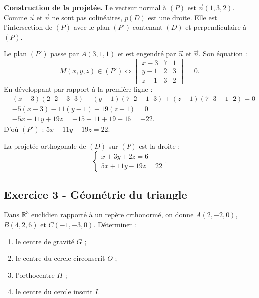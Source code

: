 \documentclass[12pt,a4paper]{article}
\begin{document}
\begin{boitecorrige}
\textbf{Construction de la projetée.}
Le vecteur normal à $(P)$ est $\vec{n}(1,3,2)$. Comme $\vec{u}$ et $\vec{n}$ ne sont pas colinéaires,
$p(D)$ est une droite. Elle est l'intersection de $(P)$ avec le plan $(P')$ contenant $(D)$ et
perpendiculaire à $(P)$.

Le plan $(P')$ passe par $A(3,1,1)$ et est engendré par $\vec{u}$ et $\vec{n}$. Son équation :
\[
  M(x,y,z)\in (P') \iff
  \begin{vmatrix} x-3 & 7 & 1 \\ y-1 & 2 & 3 \\ z-1 & 3 & 2 \end{vmatrix} = 0.
\]
En développant par rapport à la première ligne :
\begin{align*}
  &(x-3)(2\cdot2-3\cdot3) - (y-1)(7\cdot2-1\cdot3) + (z-1)(7\cdot3-1\cdot2) = 0\\
  &-5(x-3) - 11(y-1) + 19(z-1) = 0\\
  &-5x - 11y + 19z = -15 - 11 + 19 - 15 = -22.
\end{align*}
D'où $(P')$ : $5x + 11y - 19z = 22$.

La projetée orthogonale de $(D)$ sur $(P)$ est la droite :
\[
  \boxed{\begin{cases} x + 3y + 2z = 6 \\ 5x + 11y - 19z = 22 \end{cases}.}
\]
\end{boitecorrige}

\subsection*{Exercice 3 - Géométrie du triangle \niveau{\difficile}}

\begin{boiteexercice}
Dans $\mathbb{R}^3$ euclidien rapporté à un repère orthonormé, on donne $A(2,-2,0)$, $B(4,2,6)$ et
$C(-1,-3,0)$. Déterminer :
\begin{enumerate}
  \item le centre de gravité $G$ ;
  \item le centre du cercle circonscrit $O$ ;
  \item l'orthocentre $H$ ;
  \item le centre du cercle inscrit $I$.
\end{enumerate}
\end{boiteexercice}
\end{document}
